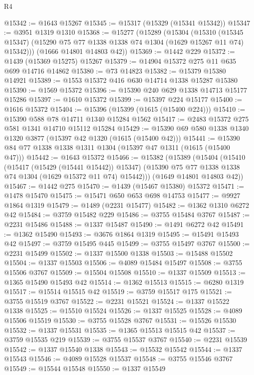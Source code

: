 \begin{lexlean}{R4}
\begin{coremodule}
@15342 := @1643 @15267
@15345 := @15317 (@15329 (@15341 @15342))
@15347 := @3951 @1319 @1310
@15368 := @15277
    (@15289
      (@15304
        (@15310
          (@15345 @15347)
          (@15290 @75 @77 @1338 @1338 @74 @1304 (@1629 @15267 @11 @74) @15342)))
      (@1666 @14801 @14803 @42))
@15369 := @1442 @229
@15372 := @1439 (@15369 @15275) @15267
@15379 := @14904 @15372 @275 @11 @635 @699 @14716 @14862
@15380 := @73 @14823
@15382 := @15379 @15380 @14921
@15389 := @1553 @15372 @416 @630 @14714 @1338 @15287 @15380
@15390 := @1569 @15372
@15396 := @15390 @240 @629 @1338 @14713 @15177 @15286
@15397 := @1610 @15372
@15399 := @15397 @224 @15177
@15400 := @1616 @15372
@15404 := @15396 (@15399 (@1615 (@15400 @224)))
@15410 := @15390 @588 @78 @14711 @1340 @15284 @1562
@15417 := @2483 @15372 @275 @581 @1341 @14710 @15112 @15284
@15429 := @15390 @69 @580 @1338 @1340 @1320 @3877 (@15397 @42 @1320 (@1615 (@15400 @42)))
@15441 := @15390 @84 @77 @1338 @1338 @1311 @1304 (@15397 @47 @1311 (@1615 (@15400 @47)))
@15442 := @1643 @15372
@15466 := @15382
    (@15389
      (@15404
        (@15410
          (@15417 (@15429 (@15441 @15442)) @15347)
          (@15390 @75 @77 @1338 @1338 @74 @1304 (@1629 @15372 @11 @74) @15442)))
      (@1649 @14801 @14803 @42))
@15467 := @1442 @275
@15470 := @1439 (@15467 @15380) @15372
@15471 := @1478 @15470
@15475 := @15471 @650 @653 @698 @14753
@15477 := @9927 @1864 @1319
@15479 := @1489 (@2231 @15477)
@15482 := @1362 @1310 @6272 @42
@15484 := @3759 @15482 @229
@15486 := @3755 @15484 @3767
@15487 := @2231 @15486
@15488 := @1337 @15487
@15490 := @1491 @6272 @42
@15491 := @1362 @15490
@15493 := @3676 @1864 @1319
@15495 := @15491 @15493 @42
@15497 := @3759 @15495 @445
@15499 := @3755 @15497 @3767
@15500 := @2231 @15499
@15502 := @1337 @15500 @1338
@15503 := @15488 @15502
@15504 := @1337 @15503
@15506 := @4089 @15484 @15497
@15508 := @3755 @15506 @3767
@15509 := @15504 @15508
@15510 := @1337 @15509
@15513 := @1365 @15490 @15493 @42
@15514 := @1362 @15513
@15515 := @6280 @1319
@15517 := @15514 @15515 @42
@15519 := @3759 @15517 @175
@15521 := @3755 @15519 @3767
@15522 := @2231 @15521
@15524 := @1337 @15522 @1338
@15525 := @15510 @15524
@15526 := @1337 @15525
@15528 := @4089 @15506 @15519
@15530 := @3755 @15528 @3767
@15531 := @15526 @15530
@15532 := @1337 @15531
@15535 := @1365 @15513 @15515 @42
@15537 := @3759 @15535 @219
@15539 := @3755 @15537 @3767
@15540 := @2231 @15539
@15542 := @1337 @15540 @1338
@15543 := @15532 @15542
@15544 := @1337 @15543
@15546 := @4089 @15528 @15537
@15548 := @3755 @15546 @3767
@15549 := @15544 @15548
@15550 := @1337 @15549

\end{coremodule}
\end{lexlean}
